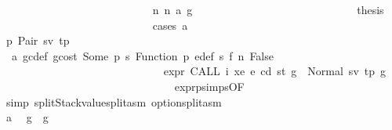 \begin{isabellebody}
\ \ \ \ \ \ \ \ \ \ \ \ \ \ \ \ \ \ \ \ \ \ \ \ \ \ \isamarkupfalse%
\ n{}{\isacharcolon}{\kern0pt}\ {\isacharparenleft}{\kern0pt}n\ a\ g{\isacharprime}{\kern0pt}{\isacharprime}{\kern0pt}{\isacharparenright}{\kern0pt}\isanewline
\ \ \ \ \ \ \ \ \ \ \ \ \ \ \ \ \ \ \ \ \ \ \ \ \ \ \isamarkupfalse%
\ \isamarkupfalse%
\ {\isacharquery}{\kern0pt}thesis\isanewline
\ \ \ \ \ \ \ \ \ \ \ \ \ \ \ \ \ \ \ \ \ \ \ \ \ \ \isamarkupfalse%
\ {\isacharparenleft}{\kern0pt}cases\ a{\isacharparenright}{\kern0pt}\isanewline
\ \ \ \ \ \ \ \ \ \ \ \ \ \ \ \ \ \ \ \ \ \ \ \ \ \ \ \ \isamarkupfalse%
\ p{}{\isacharcolon}{\kern0pt}\ {\isacharparenleft}{\kern0pt}Pair\ sv\ tp{\isacharparenright}{\kern0pt}\isanewline
\ \ \ \ \ \ \ \ \ \ \ \ \ \ \ \ \ \ \ \ \ \ \ \ \ \ \ \ \isamarkupfalse%
\ {}{}{\isacharparenleft}{\kern0pt}{}{\isacharparenright}{\kern0pt}\ a{}\ gc{\isacharunderscore}{\kern0pt}def\ gcost\ Some\ p{}\ s{}\ Function\ p{}\ e{\isacharprime}{\kern0pt}{\isacharunderscore}{\kern0pt}def\ s{}\ f{}\ n{}\ False\isanewline
\ \ \ \ \ \ \ \ \ \ \ \ \ \ \ \ \ \ \ \ \ \ \ \ \ \ \ \ \isamarkupfalse%
\ {\isachardoublequoteopen}expr\ {\isacharparenleft}{\kern0pt}CALL\ i\ xe{\isacharparenright}{\kern0pt}\ e\ cd\ st\ g\ {\isacharequal}{\kern0pt}\ Normal\ {\isacharparenleft}{\kern0pt}{\isacharparenleft}{\kern0pt}sv{\isacharcomma}{\kern0pt}\ tp{\isacharparenright}{\kern0pt}{\isacharcomma}{\kern0pt}\ g{\isacharprime}{\kern0pt}{\isacharprime}{\kern0pt}{\isacharparenright}{\kern0pt}{\isachardoublequoteclose}\isanewline
\ \ \ \ \ \ \ \ \ \ \ \ \ \ \ \ \ \ \ \ \ \ \ \ \ \ \ \ \ \ \isamarkupfalse%
\ expr{\isachardot}{\kern0pt}psimps{\isacharparenleft}{\kern0pt}{}{}{\isacharparenright}{\kern0pt}{\isacharbrackleft}{\kern0pt}OF\ {}{}{\isacharparenleft}{\kern0pt}{}{\isacharparenright}{\kern0pt}{\isacharbrackright}{\kern0pt}\ \isamarkupfalse%
\ {\isacharparenleft}{\kern0pt}simp\ split{\isacharcolon}{\kern0pt}Stackvalue{\isachardot}{\kern0pt}split{\isacharunderscore}{\kern0pt}asm\ option{\isachardot}{\kern0pt}split{\isacharunderscore}{\kern0pt}asm{\isacharparenright}{\kern0pt}\isanewline
\ \ \ \ \ \ \ \ \ \ \ \ \ \ \ \ \ \ \ \ \ \ \ \ \ \ \ \ \isamarkupfalse%
\ a{}\ \isamarkupfalse%
\ {\isachardoublequoteopen}g{}{\isacharprime}{\kern0pt}\ {\isasymle}\ g{\isacharprime}{\kern0pt}{\isacharprime}{\kern0pt}{\isachardoublequoteclose}\ \isamarkupfalse%

\end{isabellebody}
